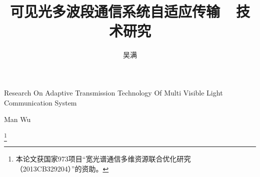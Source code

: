 \documentclass[master]{seuthesis} %
\begin{document}
\title{可见光多波段通信系统自适应传输\ \ 技术研究}{}{Research On Adaptive Transmission Technology Of Multi Visible Light Communication System}{}
\author{吴满}{Man Wu}

\authorizedate{}
\address{东南大学四牌楼校区李文正楼}
\thanks{本论文获国家973项目“宽光谱通信多维资源联合优化研究（2013CB329204）”的资助。}
\maketitle




\tableofcontents
\listoffigures
\listoftables

\begin{Main}
   
   
   
   
   
   
\end{Main}



%
%
%
\end{document}

